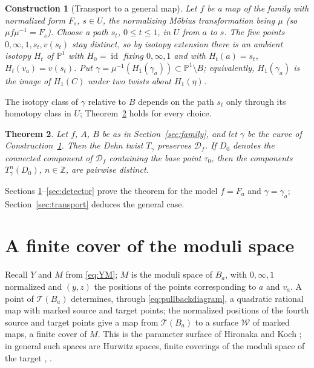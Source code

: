 \documentclass[11pt]{article}
\newcommand{\Pone}{\mathbb P^1}
\newcommand{\Z}{\mathbb Z}
\newcommand{\Teich}{\mathcal T}
\newcommand{\D}{\mathcal D}
\newcommand{\W}{\mathcal W}
\newcommand{\id}{\operatorname{id}}
\newtheorem{theorem}{Theorem}[section]
\newtheorem{construction}[theorem]{Construction}
\theoremstyle{remark}
\numberwithin{equation}{section}
\begin{document}
\begin{construction}[Transport to a general map]\label{con:transport}
Let $f$ be a map of the family with normalized form $F_s$, $s\in U$, the
normalizing M\"obius transformation being $\mu$ (so $\mu f\mu^{-1}=F_s$).
Choose a path $s_t$, $0\le t\le1$, in $U$ from $a$ to $s$. The five points
$0,\infty,1,s_t,v(s_t)$ stay distinct, so by isotopy extension there is an
ambient isotopy $H_t$ of $\Pone$ with $H_0=\id$ fixing $0,\infty,1$ and
with $H_t(a)=s_t$, $H_t(v_a)=v(s_t)$. Put
$\gamma=\mu^{-1}(H_1(\gamma_a))\subset\Pone\setminus B$; equivalently,
$H_1(\gamma_a)$ is the image of $H_1(C)$ under two twists about $H_1(\eta)$.
\end{construction}

The isotopy class of $\gamma$ relative to $B$ depends on the path $s_t$
only through its homotopy class in $U$; Theorem~\ref{thm:main} holds for
every choice.

\begin{theorem}\label{thm:main}
Let $f$, $A$, $B$ be as in Section~\ref{sec:family}, and let
$\gamma$ be the curve of Construction~\ref{con:transport}. Then the Dehn
twist $T_\gamma$ preserves $\D_f$. If $D_0$ denotes the connected component
of $\D_f$ containing the base point $\tau_0$, then the components
$T_\gamma^{n}(D_0)$, $n\in\Z$, are pairwise distinct.
\end{theorem}

Sections \ref{sec:covering}--\ref{sec:detector} prove the theorem for the
model $f=F_a$ and $\gamma=\gamma_a$; Section~\ref{sec:transport} deduces
the general case.

\section{A finite cover of the moduli space}\label{sec:covering}

Recall $Y$ and $M$ from \eqref{eq:YM}; $M$ is the moduli space of
$B_a$, with $0,\infty,1$ normalized and $(y,z)$ the positions of the points
corresponding to $a$ and $v_a$. A point of $\Teich(B_a)$ determines,
through \eqref{eq:pullbackdiagram}, a quadratic rational map with marked
source and target points; the normalized positions of the fourth source and
target points give a map from $\Teich(B_a)$ to a surface $\W$ of marked
maps, a finite cover of $M$. This is the parameter surface of Hironaka and
Koch \cite[\S\S4.1--4.2]{HKa}; in general such spaces are Hurwitz spaces,
finite coverings of the moduli space of the target \cite[Thm.\ 2.6]{Ko},
\cite[\S3.1]{KPS}.
\end{document}
